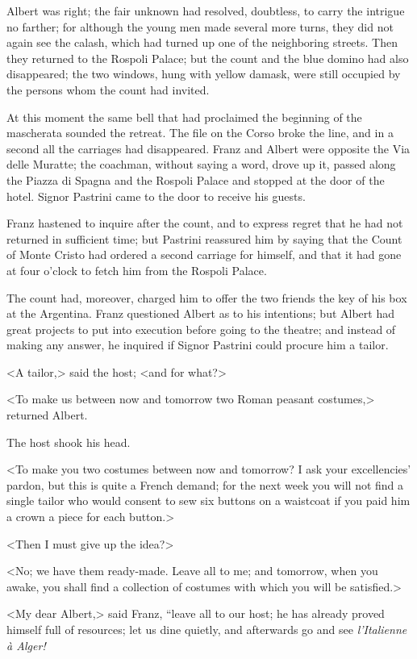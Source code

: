  Albert was right; the fair unknown had resolved, doubtless, to carry the intrigue no farther; for although the young men made several more turns, they did not again see the calash, which had turned up one of the neighboring streets. Then they returned to the Rospoli Palace; but the count and the blue domino had also disappeared; the two windows, hung with yellow damask, were still occupied by the persons whom the count had invited. 

 At this moment the same bell that had proclaimed the beginning of the mascherata sounded the retreat. The file on the Corso broke the line, and in a second all the carriages had disappeared. Franz and Albert were opposite the Via delle Muratte; the coachman, without saying a word, drove up it, passed along the Piazza di Spagna and the Rospoli Palace and stopped at the door of the hotel. Signor Pastrini came to the door to receive his guests. 

 Franz hastened to inquire after the count, and to express regret that he had not returned in sufficient time; but Pastrini reassured him by saying that the Count of Monte Cristo had ordered a second carriage for himself, and that it had gone at four o'clock to fetch him from the Rospoli Palace. 

 The count had, moreover, charged him to offer the two friends the key of his box at the Argentina. Franz questioned Albert as to his intentions; but Albert had great projects to put into execution before going to the theatre; and instead of making any answer, he inquired if Signor Pastrini could procure him a tailor. 

 <A tailor,> said the host; <and for what?> 

 <To make us between now and tomorrow two Roman peasant costumes,> returned Albert. 

 The host shook his head. 

 <To make you two costumes between now and tomorrow? I ask your excellencies' pardon, but this is quite a French demand; for the next week you will not find a single tailor who would consent to sew six buttons on a waistcoat if you paid him a crown a piece for each button.> 

 <Then I must give up the idea?> 

 <No; we have them ready-made. Leave all to me; and tomorrow, when you awake, you shall find a collection of costumes with which you will be satisfied.> 

 <My dear Albert,> said Franz, “leave all to our host; he has already proved himself full of resources; let us dine quietly, and afterwards go and see \textit{l'Italienne à Alger!}

